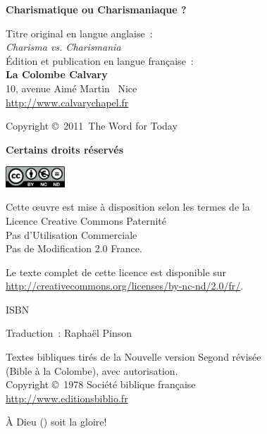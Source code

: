 \newpage
\mbox{}
\vfill

{\scriptsize

{\bfseries Charismatique ou Charismaniaque ?}

Titre original en langue anglaise~:\\
\emph{Charisma vs. Charismania} \\

Édition et publication en langue française~:\\
 {\bfseries La Colombe Calvary}\\
 10, avenue Aimé Martin ~Nice\\
 \url{http://www.calvarychapel.fr}

Copyright \copyright{}~2011~The Word for Today

{\bfseries Certains droits réservés}

\ifluatex
  \includegraphics[width=6em]{by-nc-nd_eu}
\fi

Cette \oe{}uvre est mise à disposition selon les termes de la \\
 Licence Creative Commons Paternité \\
 \ocadr Pas d'Utilisation Commerciale \\
 \ocadr Pas de Modification 2.0 France.

Le texte complet de cette licence est disponible sur \\
 \url{http://creativecommons.org/licenses/by-nc-nd/2.0/fr/}.

ISBN~\isbn

Traduction~: Raphaël Pinson

Textes bibliques tirés de la Nouvelle version Segond révisée \\
 (Bible à la Colombe), avec autorisation. \\
 Copyright \copyright{}~1978 Société biblique française \\
 \url{http://www.editionsbiblio.fr}

À Dieu (\YHWH) soit la gloire!

}
\enlargethispage{\footskip}


